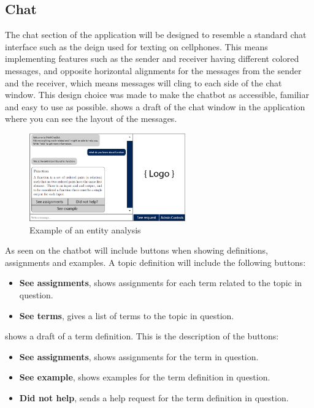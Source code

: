 \subsection{Chat}

The chat section of the application will be designed to resemble a standard chat interface such as the deign used for texting on cellphones. This means implementing features such as the sender and receiver having different colored messages, and opposite horizontal alignments for the messages from the sender and the receiver, which means messages will cling to each side of the chat window. This design choice was made to make the chatbot as accessible, familiar and easy to use as possible.
 shows a draft of the chat window in the application where you can see the layout of the messages.

\begin{figure}[H]
    \centering
    \includegraphics[width=0.6\textwidth]{figures/ChatDraft.png}
    \caption{Example of an entity analysis \cite{DemoAPI}}
    \label{fig:chat_of_MathChatBot}
\end{figure}

\noindent
As seen on  the chatbot will include buttons when showing definitions, assignments and examples.
A topic definition will include the following buttons:

\begin{itemize}
    \item \textbf{See assignments}, shows assignments for each term related to the topic in question.
    \item \textbf{See terms}, gives a list of terms to the topic in question.
\end{itemize}

\noindent
{} shows a draft of a term definition. This is the description of the buttons:

\begin{itemize}
    \item \textbf{See assignments}, shows assignments for the term in question.
    \item \textbf{See example}, shows examples for the term definition in question.
    \item \textbf{Did not help}, sends a help request for the term definition in question.
\end{itemize}



